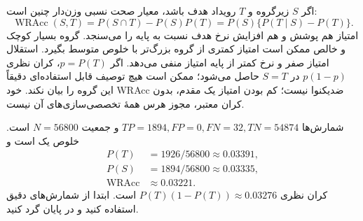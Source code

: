 \documentclass[12pt,a4paper,oneside]{report}
\newcounter{ex}[chapter]
\newenvironment{example}[1]{\refstepcounter{ex}\begin{tcolorbox}[breakable=false,title={مثال \thechapter.\arabic{ex} | #1},colframe=muted,colback=white]}{\end{tcolorbox}}
\begin{document}
اگر $S$ زیرگروه و $T$ رویداد هدف باشد، معیار صحت نسبی وزن‌دار چنین است:
\[\operatorname{WRAcc}(S,T)=P(S\cap T)-P(S)P(T)=P(S)\{P(T\mid S)-P(T)\}.\]
امتیاز هم پوشش و هم افزایش نرخ هدف نسبت به پایه را می‌سنجد. گروه بسیار کوچک و خالص ممکن است امتیاز کمتری از گروه بزرگ‌تر با خلوص متوسط بگیرد. استقلال امتیاز صفر و نرخ کمتر از پایه امتیاز منفی می‌دهد. اگر $p=P(T)$، کران نظری $p(1-p)$ در $S=T$ حاصل می‌شود؛ ممکن است هیچ توصیف قابل استفاده‌ای دقیقاً این گروه را بیان نکند. خود WRAcc ضدیکنوا نیست؛ کم بودن امتیاز یک مقدم، بدون کران معتبر، مجوز هرس همهٔ تخصصی‌سازی‌های آن نیست.

\begin{example}{کشف زیرگروه در مثال فیل}
شمارش‌ها $TP=1894,FP=0,FN=32,TN=54874$ و جمعیت $N=56800$ است. خلوص یک است و
\begin{align*}
P(T)&=1926/56800\approx0.03391,\\
P(S)&=1894/56800\approx0.03335,\\
\operatorname{WRAcc}&\approx0.03221.
\end{align*}
کران نظری $P(T)(1-P(T))\approx0.03276$ است. ابتدا از شمارش‌های دقیق استفاده کنید و در پایان گرد کنید.
\end{example}
\end{document}
